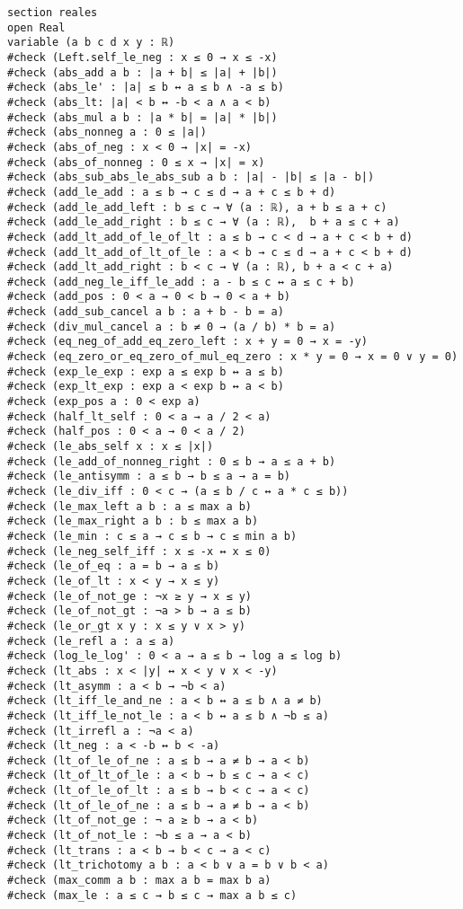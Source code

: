 \begin{verbatim}
section reales
open Real
variable (a b c d x y : ℝ)
#check (Left.self_le_neg : x ≤ 0 → x ≤ -x)
#check (abs_add a b : |a + b| ≤ |a| + |b|)
#check (abs_le' : |a| ≤ b ↔ a ≤ b ∧ -a ≤ b)
#check (abs_lt: |a| < b ↔ -b < a ∧ a < b)
#check (abs_mul a b : |a * b| = |a| * |b|)
#check (abs_nonneg a : 0 ≤ |a|)
#check (abs_of_neg : x < 0 → |x| = -x)
#check (abs_of_nonneg : 0 ≤ x → |x| = x)
#check (abs_sub_abs_le_abs_sub a b : |a| - |b| ≤ |a - b|)
#check (add_le_add : a ≤ b → c ≤ d → a + c ≤ b + d)
#check (add_le_add_left : b ≤ c → ∀ (a : ℝ), a + b ≤ a + c)
#check (add_le_add_right : b ≤ c → ∀ (a : ℝ),  b + a ≤ c + a)
#check (add_lt_add_of_le_of_lt : a ≤ b → c < d → a + c < b + d)
#check (add_lt_add_of_lt_of_le : a < b → c ≤ d → a + c < b + d)
#check (add_lt_add_right : b < c → ∀ (a : ℝ), b + a < c + a)
#check (add_neg_le_iff_le_add : a - b ≤ c ↔ a ≤ c + b)
#check (add_pos : 0 < a → 0 < b → 0 < a + b)
#check (add_sub_cancel a b : a + b - b = a)
#check (div_mul_cancel a : b ≠ 0 → (a / b) * b = a)
#check (eq_neg_of_add_eq_zero_left : x + y = 0 → x = -y)
#check (eq_zero_or_eq_zero_of_mul_eq_zero : x * y = 0 → x = 0 ∨ y = 0)
#check (exp_le_exp : exp a ≤ exp b ↔ a ≤ b)
#check (exp_lt_exp : exp a < exp b ↔ a < b)
#check (exp_pos a : 0 < exp a)
#check (half_lt_self : 0 < a → a / 2 < a)
#check (half_pos : 0 < a → 0 < a / 2)
#check (le_abs_self x : x ≤ |x|)
#check (le_add_of_nonneg_right : 0 ≤ b → a ≤ a + b)
#check (le_antisymm : a ≤ b → b ≤ a → a = b)
#check (le_div_iff : 0 < c → (a ≤ b / c ↔ a * c ≤ b))
#check (le_max_left a b : a ≤ max a b)
#check (le_max_right a b : b ≤ max a b)
#check (le_min : c ≤ a → c ≤ b → c ≤ min a b)
#check (le_neg_self_iff : x ≤ -x ↔ x ≤ 0)
#check (le_of_eq : a = b → a ≤ b)
#check (le_of_lt : x < y → x ≤ y)
#check (le_of_not_ge : ¬x ≥ y → x ≤ y)
#check (le_of_not_gt : ¬a > b → a ≤ b)
#check (le_or_gt x y : x ≤ y ∨ x > y)
#check (le_refl a : a ≤ a)
#check (log_le_log' : 0 < a → a ≤ b → log a ≤ log b)
#check (lt_abs : x < |y| ↔ x < y ∨ x < -y)
#check (lt_asymm : a < b → ¬b < a)
#check (lt_iff_le_and_ne : a < b ↔ a ≤ b ∧ a ≠ b)
#check (lt_iff_le_not_le : a < b ↔ a ≤ b ∧ ¬b ≤ a)
#check (lt_irrefl a : ¬a < a)
#check (lt_neg : a < -b ↔ b < -a)
#check (lt_of_le_of_ne : a ≤ b → a ≠ b → a < b)
#check (lt_of_lt_of_le : a < b → b ≤ c → a < c)
#check (lt_of_le_of_lt : a ≤ b → b < c → a < c)
#check (lt_of_le_of_ne : a ≤ b → a ≠ b → a < b)
#check (lt_of_not_ge : ¬ a ≥ b → a < b)
#check (lt_of_not_le : ¬b ≤ a → a < b)
#check (lt_trans : a < b → b < c → a < c)
#check (lt_trichotomy a b : a < b ∨ a = b ∨ b < a)
#check (max_comm a b : max a b = max b a)
#check (max_le : a ≤ c → b ≤ c → max a b ≤ c)

\end{verbatim}
